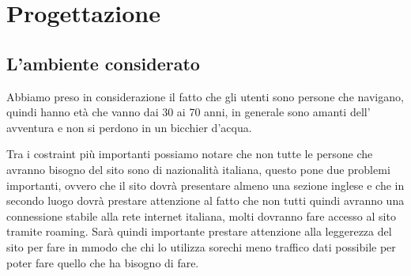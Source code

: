 \chapter{Progettazione}
\section{L'ambiente considerato}

Abbiamo preso in considerazione il fatto che gli utenti sono persone che navigano, quindi hanno età che vanno dai 30 ai 70 anni, in generale sono amanti dell' avventura e non si perdono in un bicchier d'acqua.

Tra i costraint più importanti possiamo notare che non tutte le persone che avranno bisogno del sito sono di nazionalità italiana, questo pone due problemi importanti, ovvero che il sito dovrà presentare almeno una sezione inglese e che in secondo luogo dovrà prestare attenzione al fatto che non tutti quindi avranno una connessione stabile alla rete internet italiana, molti dovranno fare accesso al sito tramite roaming. Sarà quindi importante prestare attenzione alla leggerezza del sito per fare in mmodo che chi lo utilizza sorechi meno traffico dati possibile per poter fare quello che ha bisogno di fare.